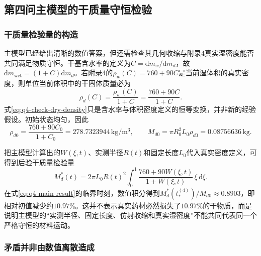 \documentclass[withoutpreface,bwprint]{cumcmthesis}
\begin{document}

\subsection{第四问主模型的干质量守恒检验}

\subsubsection{干质量检验量的构造}

主模型已经给出清晰的数值答案，但还需检查其几何收缩与附录4真实湿密度能否共同满足物质守恒。干基含水率的定义为$C=\mathrm dm_w/\mathrm dm_d$，故$\mathrm dm_{\mathrm{wet}}=(1+C)\mathrm dm_d$。若附录4的$\rho_w(C)=760+90C$是当前湿体积的真实密度，则单位当前体积中的干固体质量必为
\begin{equation}
\boxed{
\rho_d(C)=\frac{\rho_w(C)}{1+C}
=\frac{760+90C}{1+C}.
}
\label{eq:q4-check-dry-density}
\end{equation}
式\eqref{eq:q4-check-dry-density}只是含水率与体积密度定义的恒等变换，并非新的经验假设。初始状态均匀，因此
\begin{equation}
\rho_{d0}=\frac{760+90C_0}{1+C_0}
=278.7323944\,\mathrm{kg/m^3},
\qquad
M_{d0}=\pi R_0^2L_0\rho_{d0}
=0.08756636\,\mathrm{kg}.
\label{eq:q4-check-initial-mass}
\end{equation}

把主模型计算出的$W(\xi,t)$、实测半径$R(t)$和固定长度$L_0$代入真实密度定义，可得到后验干质量检验量
\begin{equation}
M_d^*(t)=2\pi L_0R(t)^2
\int_0^1\frac{760+90W(\xi,t)}{1+W(\xi,t)}\,\xi\,\mathrm d\xi.
\label{eq:q4-check-mass-proxy}
\end{equation}
在式\eqref{eq:q4-main-result}的临界时刻，数值积分得到$M_d^*(t_*^{(4)})/M_{d0}\approx0.8903$，即相对初值减少约$10.97\%$。这并不表示真实药材必然损失了$10.97\%$的干物质，而是说明主模型的“实测半径、固定长度、仿射收缩和真实湿密度”不能共同代表同一个严格守恒的材料运动。

\subsubsection{矛盾并非由数值离散造成}
\end{document}

